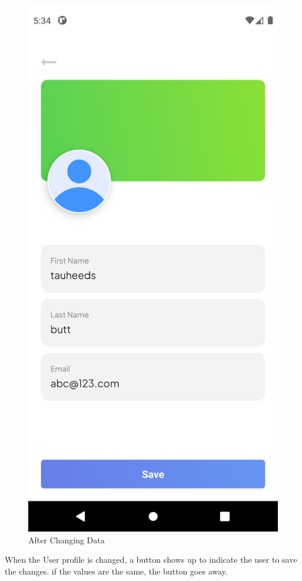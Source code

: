\begin{figure}[!htb]
\begin{minipage}{0.48\textwidth}
		\includegraphics[width=0.8\linewidth]{figures/Testing/change2.png}
		\caption{After Changing Data}\label{Fig:Data2}
	\end{minipage}
\end{figure}
When the User profile is changed, a button shows up to indicate the user to save the changes. if the values are the same, the button goes away.
\newpage
